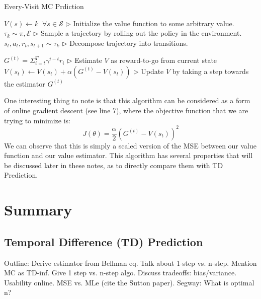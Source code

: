 \documentclass[11pt]{article}
\begin{document}
\begin{algorithm}[H]
\caption{Every-Visit MC Prdiction}
\label{algo:every_visit_mc}
\begin{algorithmic}[1]
\STATE $V(s) \leftarrow k \;\; \forall s \in \mathcal{S}$ \hfill $\triangleright$ Initialize the value function to some arbitrary value.
    \STATE $\tau_k \sim \pi, \mathcal{E}$ \hfill $\triangleright$ Sample a trajectory by rolling out the policy in the environment.
    \STATE ${s_t, a_t, r_t, s_{t+1}} \sim \tau_k$ \hfill $\triangleright$ Decompose trajectory into transitions.
    
        \STATE $G^{(t)} = \Sigma_{i=t}^T \gamma^{i-t} r_i$ \hfill $\triangleright$ Estimate $V$ as reward-to-go from current state
        \STATE $V(s_t) \leftarrow V(s_t) + \alpha (G^{(t)} - V(s_t))$ \hfill $\triangleright$ Update $V$ by taking a step towards the estimator $G^{(t)}$
    \ENDFOR
    
\ENDFOR
\end{algorithmic}
\end{algorithm}
One interesting thing to note is that this algorithm can be considered as a form of online gradient descent (see line 7), where the objective function that we are trying to minimize is:
\begin{equation}
    J(\theta) = \frac{\alpha}{2} (G^{(t)} - V(s_t))^2
\end{equation}
We can observe that this is simply a scaled version of the MSE between our value function and our value estimator. This algorithm has several properties that will be discussed later in these notes, as to directly compare them with TD Prediction.

\section{Summary}
\subsection{Temporal Difference (TD) Prediction}
Outline: Derive estimator from Bellman eq. Talk about 1-step vs. n-step. Mention MC as TD-inf. Give 1 step vs. n-step algo. Discuss tradeoffs: bias/variance. Usability online. MSE vs. MLe (cite the Sutton paper). Segway: What is optimal n?
\end{document}
